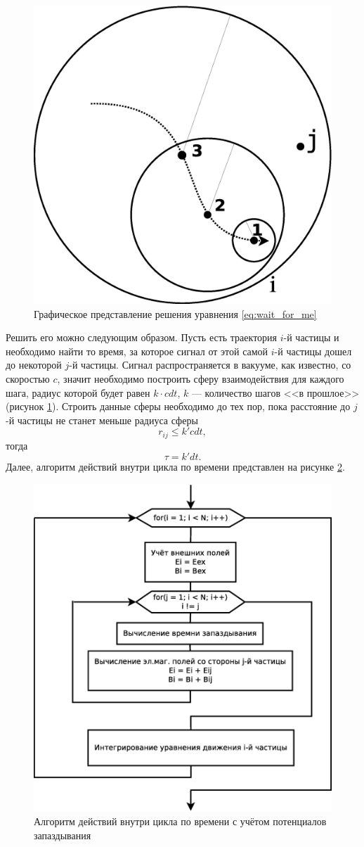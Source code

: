 \begin{figure}[h!]
\centering
\includegraphics[width=0.5\linewidth]{./fig/ch3/Diagram2tau}
\caption{Графическое представление решения уравнения \eqref{eq:wait_for_me}}
\label{fig:Diagram2tau}
\end{figure}

Решить его можно следующим образом. Пусть есть траектория $i$-й частицы и необходимо найти то время, за которое сигнал от этой самой $i$-й частицы дошел до некоторой $j$-й частицы. Сигнал распространяется в вакууме, как известно, со скоростью $c$, значит необходимо построить сферу взаимодействия для каждого шага, радиус которой будет равен $k \cdot cdt$, $k$ --- количество шагов <<в прошлое>> (рисунок \ref{fig:Diagram2tau}). Строить данные сферы необходимо до тех пор, пока расстояние до $j$-й частицы не станет меньше радиуса сферы
\begin{equation}
r_{ij} \leqslant k' c dt,
\end{equation}
тогда
\begin{equation}
\tau = k' dt.
\end{equation}
Далее, алгоритм действий внутри цикла по времени представлен на рисунке \ref{fig:Diagram3}.

\begin{figure}[h!]
\centering
\includegraphics[width=0.7\linewidth]{./fig/ch3/Diagram3}
\caption{Алгоритм действий внутри цикла по времени с учётом потенциалов запаздывания}
\label{fig:Diagram3}
\end{figure}


